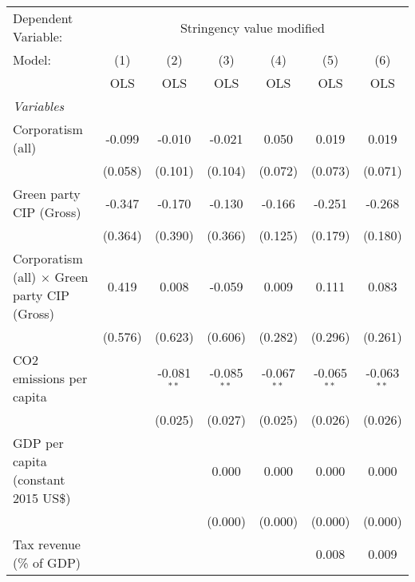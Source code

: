 
\begingroup
\centering
\begin{tabular}{lcccccc}
   \toprule
   Dependent Variable: & \multicolumn{6}{c}{Stringency value modified}\\
   Model:                                              & (1)     & (2)           & (3)           & (4)           & (5)           & (6)\\  
                                                       &  OLS    & OLS           & OLS           & OLS           & OLS           & OLS\\  
   \midrule
   \emph{Variables}\\
   Corporatism (all)                                   & -0.099  & -0.010        & -0.021        & 0.050         & 0.019         & 0.019\\   
                                                       & (0.058) & (0.101)       & (0.104)       & (0.072)       & (0.073)       & (0.071)\\   
   Green party CIP (Gross)                             & -0.347  & -0.170        & -0.130        & -0.166        & -0.251        & -0.268\\   
                                                       & (0.364) & (0.390)       & (0.366)       & (0.125)       & (0.179)       & (0.180)\\   
   Corporatism (all) $\times$ Green party CIP (Gross)  & 0.419   & 0.008         & -0.059        & 0.009         & 0.111         & 0.083\\   
                                                       & (0.576) & (0.623)       & (0.606)       & (0.282)       & (0.296)       & (0.261)\\   
   CO2 emissions per capita                            &         & -0.081$^{**}$ & -0.085$^{**}$ & -0.067$^{**}$ & -0.065$^{**}$ & -0.063$^{**}$\\   
                                                       &         & (0.025)       & (0.027)       & (0.025)       & (0.026)       & (0.026)\\   
   GDP per capita (constant 2015 US\$)                 &         &               & 0.000         & 0.000         & 0.000         & 0.000\\   
                                                       &         &               & (0.000)       & (0.000)       & (0.000)       & (0.000)\\   
   Tax revenue (\% of GDP)                             &         &               &               &               & 0.008         & 0.009\\   

\end{tabular}
